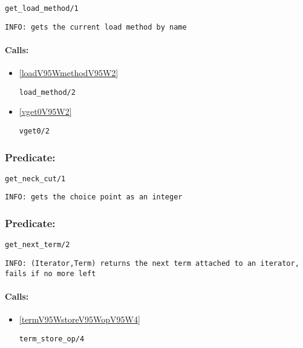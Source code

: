 \begin{verbatim}
get_load_method/1
\end{verbatim}

{\small \begin{verbatim}
INFO: gets the current load method by name

\end{verbatim}}
\paragraph{Calls:} 
\begin{itemize}
\item \ref{loadV95WmethodV95W2} 
\begin{verbatim}
load_method/2
\end{verbatim}

\item \ref{vget0V95W2} 
\begin{verbatim}
vget0/2
\end{verbatim}

\end{itemize}

\subsubsection{Predicate:} \label{getV95WneckV95WcutV95W1}

\begin{verbatim}
get_neck_cut/1
\end{verbatim}

{\small \begin{verbatim}
INFO: gets the choice point as an integer

\end{verbatim}}

\subsubsection{Predicate:} \label{getV95WnextV95WtermV95W2}

\begin{verbatim}
get_next_term/2
\end{verbatim}

{\small \begin{verbatim}
INFO: (Iterator,Term) returns the next term attached to an iterator, fails if no more left

\end{verbatim}}
\paragraph{Calls:} 
\begin{itemize}
\item \ref{termV95WstoreV95WopV95W4} 
\begin{verbatim}
term_store_op/4
\end{verbatim}

\end{itemize}

